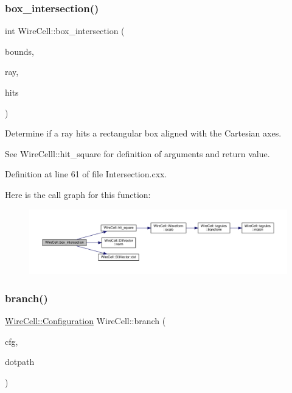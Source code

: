 \subsubsection{\texorpdfstring{box\+\_\+intersection()}{box\_intersection()}}
{\footnotesize\ttfamily int Wire\+Cell\+::box\+\_\+intersection (\begin{DoxyParamCaption}\item[{const \hyperlink{namespace_wire_cell_a3ab20d9b438feb7eb1ffaab9ba98af0c}{Ray} \&}]{bounds,  }\item[{const \hyperlink{namespace_wire_cell_a3ab20d9b438feb7eb1ffaab9ba98af0c}{Ray} \&}]{ray,  }\item[{\hyperlink{namespace_wire_cell_a3ab20d9b438feb7eb1ffaab9ba98af0c}{Ray} \&}]{hits }\end{DoxyParamCaption})}

Determine if a ray hits a rectangular box aligned with the Cartesian axes.

See Wire\+Celll\+::hit\+\_\+square for definition of arguments and return value. 

Definition at line 61 of file Intersection.\+cxx.

Here is the call graph for this function\+:
\nopagebreak
\begin{figure}[H]
\begin{center}
\leavevmode
\includegraphics[width=350pt]{namespace_wire_cell_a2e8924bbcd70754adeb72b8e14f1d987_cgraph}
\end{center}
\end{figure}
\mbox{\label{namespace_wire_cell_ade8a8d63c0beb7335d7f969903bfeedc}} 
\subsubsection{\texorpdfstring{branch()}{branch()}}
{\footnotesize\ttfamily \hyperlink{namespace_wire_cell_a9f705541fc1d46c608b3d32c182333ee}{Wire\+Cell\+::\+Configuration} Wire\+Cell\+::branch (\begin{DoxyParamCaption}\item[{\hyperlink{namespace_wire_cell_a9f705541fc1d46c608b3d32c182333ee}{Wire\+Cell\+::\+Configuration}}]{cfg,  }\item[{const std\+::string \&}]{dotpath }\end{DoxyParamCaption})}



